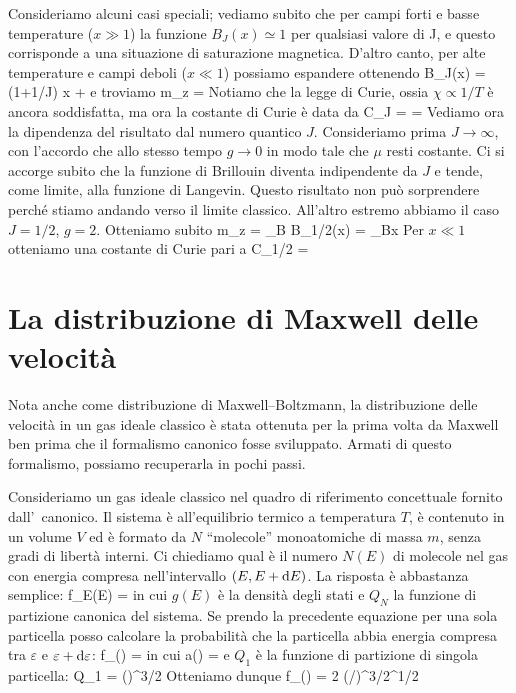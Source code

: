 Consideriamo alcuni casi speciali; vediamo subito che per campi forti e basse temperature ($x \gg 1$) la funzione $B_J(x) \simeq 1$ per qualsiasi valore di J, e questo corrisponde a una situazione di saturazione magnetica. D'altro canto, per alte temperature e campi deboli ($x \ll 1$) possiamo espandere ottenendo
\be
B_J(x) = (1+1/J) x + \cdots
\ee
e troviamo
\be
m_z = 
\ee
Notiamo che la legge di Curie, ossia $\chi \propto 1/T$ è ancora soddisfatta, ma ora la costante di Curie è data da
\be
C_J =  = 
\ee
Vediamo ora la dipendenza del risultato dal numero quantico $J$. Consideriamo prima $J\to\infty$, con l'accordo che allo stesso tempo $g\to 0$ in modo tale che $\mu$ resti costante. Ci si accorge subito che la funzione di Brillouin diventa indipendente da $J$ e tende, come limite, alla funzione di Langevin. Questo risultato non può sorprendere perché stiamo andando verso il limite classico. All'altro estremo abbiamo il caso $J=1/2$, $g=2$. Otteniamo subito
\be
m_z = \mu_B B_{1/2}(x) = \mu_B\tanh x
\ee
Per $x\ll 1$ otteniamo una costante di Curie pari a
\be
C_{1/2} = 
\ee

\section{La distribuzione di Maxwell delle velocità}

Nota anche come distribuzione di Maxwell--Boltzmann, la distribuzione delle velocità in un gas ideale classico è stata ottenuta per la prima volta da Maxwell ben prima che il formalismo canonico fosse sviluppato. Armati di questo formalismo, possiamo recuperarla in pochi passi.

Consideriamo un gas ideale classico nel quadro di riferimento concettuale fornito dall'\ensemble\ canonico. Il sistema è all'equilibrio termico a temperatura $T$, è contenuto in un volume $V$ ed è formato da $N$ ``molecole'' monoatomiche di massa $m$, senza gradi di libertà interni. Ci chiediamo qual è il numero $N(E)$ di molecole nel gas con energia compresa nell'intervallo $(E,E+{\textrm d}E)$. La risposta è abbastanza semplice:
%
\be
{} \equiv f_{E}(E) = 
\ee
%
in cui $g(E)$ è la densità degli stati e $Q_{N}$ la funzione di partizione canonica del sistema. Se prendo la precedente equazione per una sola particella posso calcolare la probabilità che la particella abbia energia compresa tra $\varepsilon$ e $\varepsilon+{\textrm d}\varepsilon$:
%
\be
f_{\varepsilon}(\varepsilon)\de{\varepsilon} = 
\ee
%
in cui
%
\be
a(\varepsilon) = 
\ee
%
e $Q_{1}$ è la funzione di partizione di singola particella:
%
\be
Q_{1} = \left(\right)^{3/2}
\ee
%
Otteniamo dunque
%
\be
f_{\varepsilon}(\varepsilon)\de{\varepsilon} = 2 (\beta/\pi)^{3/2}\varepsilon^{1/2}\de{\varepsilon}
\ee
%


